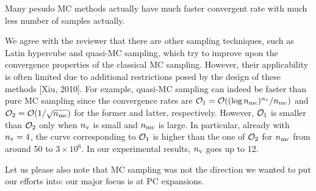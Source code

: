 \begin{reviewer}
Many pesudo MC methods actually have much faster convergent rate with much less number of samples actually.
\end{reviewer}
\begin{authors}
We agree with the reviewer that there are other sampling techniques, such as Latin hypercube and quasi-MC sampling, which try to improve upon the convergence properties of the classical MC sampling.
However, their applicability is often limited due to additional restrictions posed by the design of these methods [Xiu, 2010].
For example, quasi-MC sampling can indeed be faster than pure MC sampling since the convergence rates are $\mathcal{O}_1 = \mathcal{O}((\log{n_\text{mc}})^{n_\text{v}} / {n_\text{mc}})$ and $\mathcal{O}_2 = \mathcal{O}(1 / \sqrt{{n_\text{mc}}})$ for the former and latter, respectively.
However, $\mathcal{O}_1$ is smaller than $\mathcal{O}_2$ only when ${n_\text{v}}$ is small and ${n_\text{mc}}$ is large.
In particular, already with ${n_\text{v}} = 4$, the curve corresponding to $\mathcal{O}_1$ is higher than the one of $\mathcal{O}_2$ for ${n_\text{mc}}$ from around 50 to $3 \times 10^6$.
In our experimental results, ${n_\text{v}}$ goes up to 12.

Let us please also note that MC sampling was not the direction we wanted to put our efforts into: our major focus is at PC expansions.

\end{authors}

